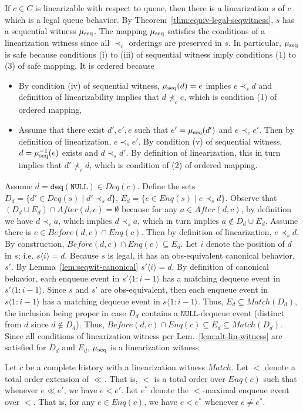 \documentclass{LMCS}
\newcommand{\NULL}{\ensuremath{\mathtt{NULL}}}
\newcommand{\deq}{\ensuremath{\mathtt{deq}}}
\newcommand{\Match}{\ensuremath{\mathit{Match}}}
\newcommand{\Deq}[1]{\ensuremath{\mathit{Deq}({#1})}}
\newcommand{\Enq}[1]{\ensuremath{\mathit{Enq}({#1})}}
\newcommand{\Before}[2]{\ensuremath{\mathit{Before}({#1},{#2})}}
\newcommand{\After}[2]{\ensuremath{\mathit{After}({#1},{#2})}}
\newcommand{\mus}{\mu_{\rm seq}}
\newcommand{\seqx}[2]{\ensuremath{#1\langle #2\rangle}}
\begin{document}
\noindent{\bf ($\Rightarrow$)} If $c \in C$ is linearizable with respect to queue, then there is a linearization $s$ of $c$ which is a legal queue behavior.
By Theorem~\ref{thm:equiv-legal-seqwitness}, $s$ has a sequential witness $\mus$.
The mapping $\mus$ satisfies the conditions of a linearization witness since all $\prec_c$ orderings are preserved in $s$.
In particular, $\mus$ is safe because conditions (i) to (iii) of sequential witness imply conditions (1) to (3) of safe mapping.
It is ordered because
\begin{itemize}
\item By condition (iv) of sequential witness, $\mus(d)=e$ implies $e\prec_s d$ and definition of linearizability implies that $d\not\prec_c e$, which is condition (1) of ordered mapping,
\item Assume that there exist $d',e',e$ such that $e'=\mus(d')$ and $e\prec_c e'$.
Then by definition of linearization, $e\prec_s e'$.
By condition (v) of sequential witness, $d=\mus^{-1}(e)$ exists and $d\prec_s d'$.
By definition of linearization, this in turn implies that $d'\not\prec_c d$, which is condition of (2) of ordered mapping.
\end{itemize}
Assume $d=\deq(\NULL)\in \Deq c$.
Define the sets $D_d=\{d'\in \Deq s \mid d'\prec_s d\}$, $E_d=\{e\in \Enq s \mid e\prec_s d\}$.
Observe that $(D_d\cup E_d)\cap \After d c=\emptyset$ because for any $a\in \After d c$, by definition we have $d\prec_c a$, which implies $d\prec_s a$, which in turn implies $a\notin D_d\cup E_d$.
Assume there is $e\in \Before d c \cap \Enq c$.
Then by definition of linearization, $e\prec_s d$.
By construction, $\Before d c\cap \Enq c\subseteq E_d$.
Let $i$ denote the position of $d$ in $s$; i.e. $\seqx s i=d$.
Because $s$ is legal, it has an obs-equivalent canonical behavior, $s'$.
By Lemma~\ref{lem:seqwit-canonical} $\seqx {s'} i=d$.
By definition of canonical behavior, each enqueue event in $\seqx {s'} {1:i-1}$ has a matching dequeue event in $\seqx {s'} {1:i-1}$.
Since $s$ and $s'$ are obs-equivalent, then each enqueue event in $\seqx {s} {1:i-1}$ has a matching dequeue event in $\seqx {s} {1:i-1}$.
Thus, $E_d\subseteq \Match(D_d)$, the inclusion being proper in case $D_d$ contains a {\NULL}-dequeue event (distinct from $d$ since $d\notin D_d$).
Thus, $\Before d c\cap \Enq c\subseteq E_d\subseteq \Match(D_d)$.
Since all conditions of linearization witness per Lem.~\ref{lem:alt-lin-witness} are satisfied for $D_d$ and $E_d$, $\mus$ is a linearization witness.

\noindent{\bf ($\Leftarrow$)}
Let $c$ be a complete history with a linearization witness $\Match$.
Let $<$ denote a total order extension of $\ll$.
That is, $<$ is a total order over $\Enq c$ such that whenever $e\ll e'$, we have $e<e'$.
Let $e^*$ denote the $<$-maximal enqueue event over $<$.
That is, for any $e\in \Enq c$, we have $e<e^*$ whenever $e\neq e^*$.
\end{document}
